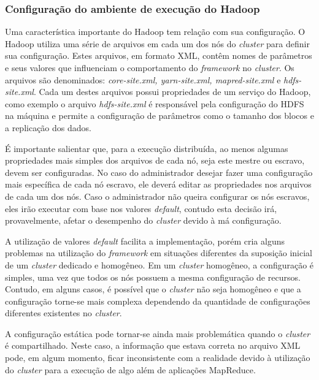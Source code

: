 \subsubsection{Configuração do ambiente de execução do Hadoop}
Uma característica importante do Hadoop tem relação com sua configuração. O Hadoop utiliza uma série de arquivos em cada um dos nós do \textit{cluster} para definir sua configuração. Estes arquivos, em formato XML, contêm nomes de parâmetros e seus valores que influenciam o comportamento do \textit{framework} no \textit{cluster}. Os arquivos são denominados: \textit{core-site.xml, yarn-site.xml, mapred-site.xml} e \textit{hdfs-site.xml}. Cada um destes arquivos possui propriedades de um serviço do Hadoop, como exemplo o arquivo \textit{hdfs-site.xml} é responsável pela configuração do HDFS na máquina e permite a configuração de parâmetros como o tamanho dos blocos e a replicação dos dados.

É importante salientar que, para a execução distribuída, ao menos algumas propriedades mais simples dos arquivos de cada nó, seja este mestre ou escravo, devem ser configuradas. No caso do administrador desejar fazer uma configuração mais específica de cada nó escravo, ele deverá editar as propriedades nos arquivos de cada um dos nós. Caso o administrador não queira configurar os nós escravos, eles irão executar com base nos valores \textit{default}, contudo esta decisão irá, provavelmente, afetar o desempenho do \textit{cluster} devido à má configuração.

A utilização de valores \textit{default} facilita a implementação, porém cria alguns problemas na utilização do \textit{framework} em situações diferentes da suposição inicial de um \textit{cluster} dedicado e homogêneo. Em um \textit{cluster} homogêneo, a configuração é simples, uma vez que todos os nós possuem a mesma configuração de recursos. Contudo, em alguns casos, é possível que o \textit{cluster} não seja homogêneo e que a configuração torne-se mais complexa dependendo da quantidade de configurações diferentes existentes no \textit{cluster}.

A configuração estática pode tornar-se ainda mais problemática quando o \textit{cluster} é compartilhado. Neste caso, a informação que estava correta no arquivo XML pode, em algum momento, ficar inconsistente com a realidade devido à utilização do \textit{cluster} para a execução de algo além de aplicações MapReduce.
 




